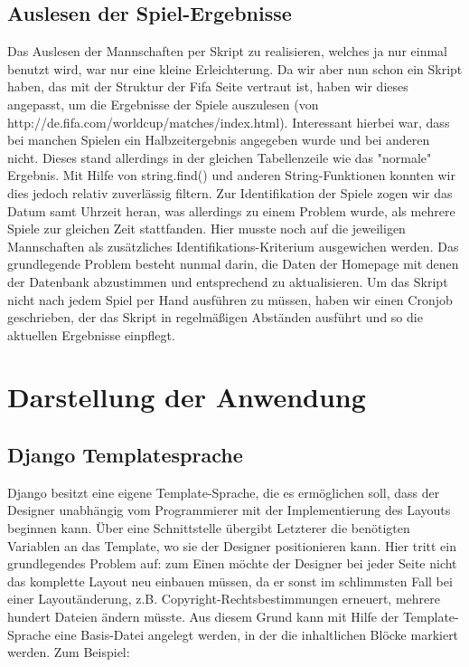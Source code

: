 \section{Auslesen der Spiel-Ergebnisse}
Das Auslesen der Mannschaften per Skript zu realisieren, welches ja nur einmal 
benutzt wird, war nur eine kleine Erleichterung. Da wir aber nun schon ein
Skript haben, das mit der Struktur der Fifa Seite vertraut ist, haben wir
dieses angepasst, um die Ergebnisse der Spiele auszulesen  (von
http://de.fifa.com/worldcup/matches/index.html). Interessant hierbei war, dass 
bei manchen Spielen ein Halbzeitergebnis angegeben wurde und bei anderen nicht.
Dieses stand allerdings in der gleichen Tabellenzeile wie das "normale" 
Ergebnis. Mit Hilfe von string.find() und anderen String-Funktionen konnten wir
dies jedoch relativ zuverlässig filtern. Zur Identifikation der Spiele zogen
wir das Datum samt Uhrzeit heran, was allerdings zu einem Problem wurde, als 
mehrere Spiele zur gleichen Zeit stattfanden. Hier musste noch auf die 
jeweiligen Mannschaften als zusätzliches Identifikations-Kriterium ausgewichen 
werden. Das grundlegende Problem besteht nunmal darin, die Daten der Homepage 
mit denen der Datenbank abzustimmen und entsprechend zu aktualisieren. Um das 
Skript nicht nach jedem Spiel per Hand ausführen zu müssen, haben wir einen 
Cronjob geschrieben, der das Skript in regelmäßigen Abständen ausführt und so 
die aktuellen Ergebnisse einpflegt.

\chapter{Darstellung der Anwendung}
\section{Django Templatesprache}
Django besitzt eine eigene Template-Sprache, die es ermöglichen soll, dass der 
Designer unabhängig vom Programmierer mit der Implementierung des Layouts 
beginnen kann. Über eine Schnittstelle übergibt Letzterer die benötigten 
Variablen an das Template, wo sie der Designer positionieren kann. Hier tritt 
ein grundlegendes Problem auf: zum Einen möchte der Designer bei jeder Seite 
nicht das komplette Layout neu einbauen müssen, da er sonst im schlimmsten Fall
bei einer Layoutänderung, z.B. Copyright-Rechtsbestimmungen erneuert, mehrere 
hundert Dateien ändern müsste. Aus diesem Grund kann mit Hilfe der 
Template-Sprache eine Basis-Datei angelegt werden, in der die inhaltlichen 
Blöcke markiert werden. Zum Beispiel:

